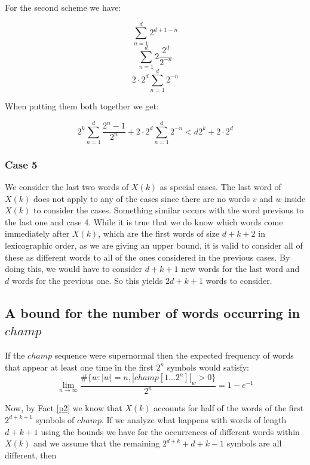 \documentclass[11pt,a4paper]{tesis}
\newcommand{\note}[1]{\textbf{\color{red}{#1}}}
\begin{document}
For the second scheme we have:

$$ \sum_{n=1}^{d} 2^{d + 1 - n}$$
$$ \sum_{n=1}^{d} 2 \frac{2^d}{2^{- n}}$$
$$ 2 \cdot 2^d \sum_{n=1}^{d} 2^{- n}$$

When putting them both together we get:

$$  2^k \sum_{n=1}^{d} \frac{2^n - 1}{2^n}  + 2 \cdot 2^d \sum_{n=1}^{d} 2^{- n} < d2^k + 2 \cdot 2^d$$

\subsubsection{Case 5}

We consider the last two words of $X(k)$ as special cases. The last word of $X(k)$ does not apply to any of the cases since there are no words $v$ and $w$ inside $X(k)$ to consider the cases. Something similar occurs with the word previous to the last one and case 4. 
While it is true that we do know which words come immediately after  $X(k)$, which are the first words of size $d+k+2$ in lexicographic order, as we are giving an upper bound, it is valid to consider all of these as different words to all of the ones considered in the previous cases.
By doing this, we would have to consider $d+k+1$ new words for the last word and $d$ words for the previous one. So this yields $2d+k+1$ words to consider.


\subsection{A bound for the number of words occurring in $champ$}%

If the $champ$ %
 sequence were supernormal then the expected frequency of words that appear at least one time in the first $2^n$ symbols would satisfy:
$$\lim_{n\to\infty} \frac{\#\{w: |w| = n  , |champ[1...2^n]|_w > 0\}}{2^n}  = 1 - e^{-1}$$


Now, by Fact \ref{p2} we know that $X(k)$ accounts for half of the words of the first $2^{d+k+1}$ symbols of $champ$. 
If we analyze what happens with words of length $d+k+1$ using the bounds we have for the occurrences of different words within $X(k)$ and we assume that the remaining $2^{d+k} + d + k - 1$  symbols are all different, then
\end{document}
